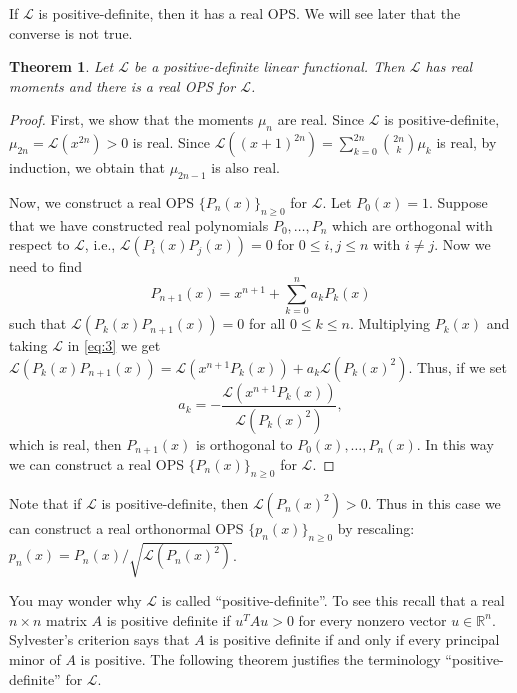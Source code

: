 \documentclass{amsart}
\numberwithin{equation}{section}
\newtheorem{thm}{Theorem}[section]
\theoremstyle{definition}
\newcommand{\RR}{\mathbb{R}}
\newcommand\LL{\mathcal{L}}
\begin{document}
If \( \LL \) is positive-definite, then it has a real OPS. We will see
later that the converse is not true.

\begin{thm}\label{thm:pos-def-ops}
  Let \( \LL \) be a positive-definite linear functional. Then
  \( \LL \) has real moments and there is a real OPS for \( \LL \).
\end{thm}

\begin{proof}
  First, we show that the moments \( \mu_n \) are real. Since
  \( \LL \) is positive-definite, \( \mu_{2n} = \LL(x^{2n}) >0 \) is
  real. Since
  \( \LL((x+1)^{2n}) = \sum_{k=0}^{2n}\binom{2n}{k} \mu_{k} \) is
  real, by induction, we obtain that \( \mu_{2n-1} \) is also real.

  Now, we construct a real OPS \( \{ P_n(x) \}_{n\ge 0} \) for
  \( \LL \). Let \( P_0(x) = 1 \). Suppose that we have constructed
  real polynomials \( P_0,\dots,P_n \) which are orthogonal with
  respect to \( \LL \), i.e., \( \LL(P_i(x)P_j(x)) = 0 \) for
  \( 0\le i,j\le n \) with \( i\ne j \). Now we need to find
  \begin{equation}\label{eq:3}
    P_{n+1} (x) = x^{n+1} + \sum_{k=0}^n a_k P_k(x)
  \end{equation}
  such that \( \LL(P_k(x)P_{n+1}(x)) = 0 \) for all \( 0\le k\le n \).
  Multiplying \( P_k(x) \) and taking \( \LL \) in \eqref{eq:3} we get
  \( \LL(P_k(x)P_{n+1}(x)) = \LL(x^{n+1}P_k(x))+a_k\LL(P_k(x)^2) \).
  Thus, if we set
  \[
    a_k = - \frac{\LL(x^{n+1}P_k(x))}{\LL(P_k(x)^2)},
  \]
  which is real, then \( P_{n+1}(x) \) is orthogonal to
  \( P_0(x),\dots,P_n(x) \). In this way we can construct a real OPS
  \( \{ P_n(x) \}_{n\ge 0} \) for \( \LL \).
\end{proof}

Note that if \( \LL \) is positive-definite, then
\( \LL(P_n(x)^2)>0 \). Thus in this case we can construct a real
orthonormal OPS \( \{ p_n(x) \}_{n\ge 0} \) by rescaling:
\( p_n(x) = P_n(x)/\sqrt{\LL(P_n(x)^2)} \).

\medskip

You may wonder why \( \LL \) is called ``positive-definite''. To see
this recall that a real \( n\times n \) matrix \( A \) is positive
definite if \( u^T A u >0 \) for every nonzero vector
\( u\in \RR^n \). Sylvester's criterion says that \( A \) is positive
definite if and only if every principal minor of \( A \) is positive.
The following theorem justifies the terminology ``positive-definite''
for \( \LL \).
\end{document}

